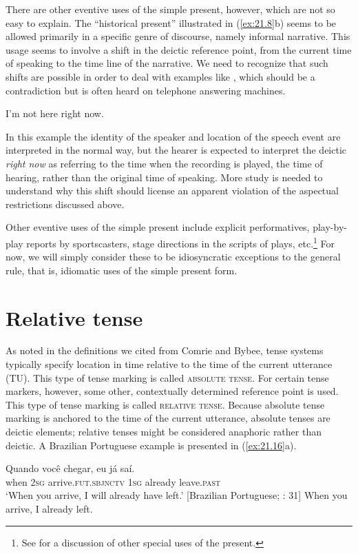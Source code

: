 There are other eventive uses of the simple present, however, which are not so easy to explain. The “historical present” illustrated in (\ref{ex:21.8}b) seems to be allowed primarily in a specific genre of discourse, namely informal narrative. This usage seems to involve a shift in the deictic reference point, from the current time of speaking to the time line of the narrative. We need to recognize that such shifts are possible in order to deal with examples like , which should be a contradiction but is often heard on telephone answering machines.


\ea \label{ex:21.15}
I’m not here right now.
\z


In this example the identity of the speaker and location of the speech event are interpreted in the normal way, but the hearer is expected to interpret the deictic \textit{right now} as referring to the time when the recording is played, the time of hearing, rather than the original time of speaking. More study is needed to understand why this shift should license an apparent violation of the aspectual restrictions discussed above.



Other eventive uses of the simple present include explicit performatives, play-by-play reports by sportscasters, stage directions in the scripts of plays, etc.\footnote{See \citet{Klein2009} for a discussion of other special uses of the present.} For now, we will simply consider these to be idiosyncratic exceptions to the general rule, that is, idiomatic uses of the simple present form.


\section{Relative tense}\label{sec:21.4}

As noted in the definitions we cited from Comrie and Bybee, tense systems typically specify location in time relative to the time of the current utterance (TU). This type of tense marking is called \textsc{absolute tense}. For certain tense markers, however, some other, contextually determined reference point is used. This type of tense marking is called \textsc{relative tense}. Because absolute tense marking is anchored to the time of the current utterance, absolute tenses are deictic elements; relative tenses might be considered anaphoric rather than deictic. A Brazilian Portuguese example is presented in (\ref{ex:21.16}a).


\ea \label{ex:21.16}
\ea  \gll Quando  você  chegar,{\rmfnm}  eu  já  saí.\\
when  \textsc{2sg}  arrive.\textsc{fut.sbjnctv}  \textsc{1sg}  already  leave.\textsc{past}\\
\glt ‘When you arrive, I will already have left.’   [Brazilian Portuguese; \citealt{Comrie1985}: 31]
\ex   *When you arrive, I already left.
\z \z
{}


